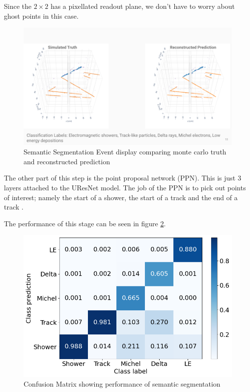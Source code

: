 Since the $2 \times 2$ has a pixellated readout plane, we don't have to worry about ghost points in this case.

\begin{figure}[H]
  \centering
  \includegraphics[width=120mm]{figures/semanticEvent.png}
  \caption{Semantic Segmentation Event display comparing monte carlo truth and reconstructed prediction}
  \label{semanticEvent}
\end{figure}

The other part of this step is the point proposal network (PPN).
This is just 3 layers attached to the UResNet model.
The job of the PPN is to pick out points of interest; namely the start of a shower, the start of a track and the end of a track \cite{Tilley_2021}.

The performance of this stage can be seen in figure \ref{semanticPerformance}.

\begin{figure}[H]
  \centering
  \includegraphics[width=120mm]{figures/semanticPerformance.png}
  \caption{Confusion Matrix showing performance of semantic segmentation}
  \label{semanticPerformance}
\end{figure}

